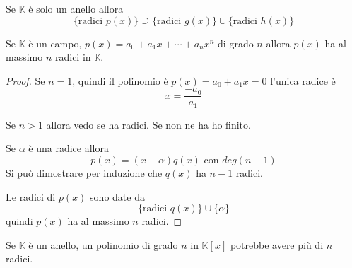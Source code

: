 \begin{theorem}
	Se $\mathbb{K}$ \`e solo un anello allora
	\begin{equation*}
		\{ \text{radici } p(x) \} \supseteq
		\{ \text{radici } g(x) \} \cup \{ \text{radici } h(x) \}
	\end{equation*}
\end{theorem}

\begin{theorem}
	Se $\mathbb{K}$ \`e un campo, $p(x) = a_0 + a_1 x + \cdots + a_n x^n$ di grado $n$ allora
	$p(x)$ ha al massimo $n$ radici in $\mathbb{K}$.
	\begin{proof}
		Se $n = 1$, quindi il polinomio \`e $p(x) = a_0 + a_1 x = 0$ l'unica radice \`e
		\begin{equation*}
			x = \frac{-a_0}{a_1}
		\end{equation*}

		Se $n > 1$ allora vedo se ha radici. Se non ne ha ho finito.

		Se $\alpha$ \`e una radice allora
		\begin{equation*}
			p(x) = (x - \alpha) q(x) \text{ con } deg(n - 1)
		\end{equation*}
		Si pu\`o dimostrare per induzione che $q(x)$ ha $n - 1$ radici.

		Le radici di $p(x)$ sono date da
		\begin{equation*}
			\{ \text{radici } q(x) \} \cup \{ \alpha \}
		\end{equation*}
		quindi $p(x)$ ha al massimo $n$ radici.
	\end{proof}
\end{theorem}

\begin{observation}
	Se $\mathbb{K}$ \`e un anello, un polinomio di grado $n$ in $\mathbb{K}[x]$ potrebbe
	avere pi\`u di $n$ radici.
\end{observation}